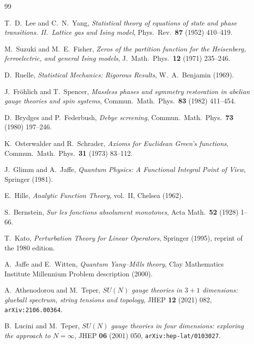 \documentclass[11pt,a4paper]{article}
\theoremstyle{definition}
\theoremstyle{remark}
\begin{document}
\begin{thebibliography}{99}

T.~D.~Lee and C.~N.~Yang,
\emph{Statistical theory of equations of state and phase transitions.
II.\ Lattice gas and Ising model},
Phys.\ Rev.\ \textbf{87} (1952) 410--419.

M.~Suzuki and M.~E.~Fisher,
\emph{Zeros of the partition function for the Heisenberg, ferroelectric,
and general Ising models},
J.\ Math.\ Phys.\ \textbf{12} (1971) 235--246.

D.~Ruelle,
\emph{Statistical Mechanics: Rigorous Results}, W.~A.~Benjamin (1969).

J.~Fr\"ohlich and T.~Spencer,
\emph{Massless phases and symmetry restoration in abelian gauge
theories and spin systems},
Commun.\ Math.\ Phys.\ \textbf{83} (1982) 411--454.

D.~Brydges and P.~Federbush,
\emph{Debye screening},
Commun.\ Math.\ Phys.\ \textbf{73} (1980) 197--246.

K.~Osterwalder and R.~Schrader,
\emph{Axioms for Euclidean Green's functions},
Commun.\ Math.\ Phys.\ \textbf{31} (1973) 83--112.

J.~Glimm and A.~Jaffe,
\emph{Quantum Physics: A Functional Integral Point of View},
Springer (1981).

E.~Hille,
\emph{Analytic Function Theory}, vol.~II, Chelsea (1962).

S.~Bernstein,
\emph{Sur les fonctions absolument monotones},
Acta Math.\ \textbf{52} (1928) 1--66.

T.~Kato,
\emph{Perturbation Theory for Linear Operators}, Springer (1995),
reprint of the 1980 edition.

A.~Jaffe and E.~Witten,
\emph{Quantum Yang--Mills theory}, Clay Mathematics Institute
Millennium Problem description (2000).

A.~Athenodorou and M.~Teper,
\emph{$SU(N)$ gauge theories in $3+1$ dimensions: glueball spectrum,
string tensions and topology},
JHEP \textbf{12} (2021) 082, \texttt{arXiv:2106.00364}.

B.~Lucini and M.~Teper,
\emph{$SU(N)$ gauge theories in four dimensions: exploring the
approach to $N = \infty$},
JHEP \textbf{06} (2001) 050, \texttt{arXiv:hep-lat/0103027}.


\end{thebibliography}
\end{document}
